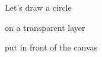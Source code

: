 \documentclass[preview]{standalone}
\begin{document}
\begin{center}
Let's draw a circle

on a transparent layer

put in front of the canvas
\end{center}
\end{document}
